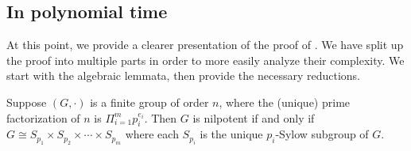 \documentclass{article}
\begin{document}

\subsection{In polynomial time}

At this point, we provide a clearer presentation of the proof of \cite[Theorem~7]{at06}.
We have split up the proof into multiple parts in order to more easily analyze their complexity.
We start with the algebraic lemmata, then provide the necessary reductions.

\begin{lemma}\label{lem:sylow}
  Suppose $(G, \cdot)$ is a finite group of order $n$, where the (unique) prime factorization of $n$ is $\Pi_{i = 1}^m p_i^{e_i}$.
  Then $G$ is nilpotent if and only if $G \cong S_{p_1} \times S_{p_2} \times \dotsb \times S_{p_m}$ where each $S_{p_i}$ is the unique $p_i$-Sylow subgroup of $G$.
\end{lemma}

\end{document}
